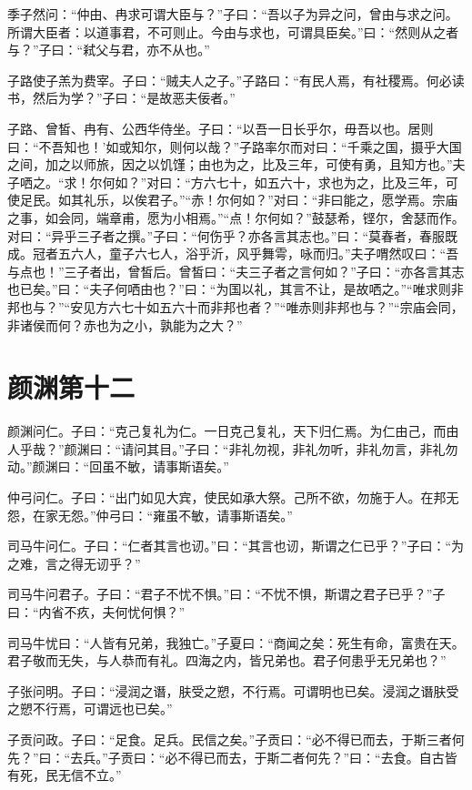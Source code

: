 \documentclass[twoside,openany]{book}
\begin{document}
季子然问：“仲由、冉求可谓大臣与？”子曰：“吾以子为异之问，曾由与求之问。所谓大臣者：以道事君，不可则止。今由与求也，可谓具臣矣。”曰：“然则从之者与？”子曰：“弒父与君，亦不从也。” 

子路使子羔为费宰。子曰：“贼夫人之子。”子路曰：“有民人焉，有社稷焉。何必读书，然后为学？”子曰：“是故恶夫佞者。” 

子路、曾皙、冉有、公西华侍坐。子曰：“以吾一日长乎尔，毋吾以也。居则曰：“不吾知也！’如或知尔，则何以哉？”子路率尔而对曰：“千乘之国，摄乎大国之间，加之以师旅，因之以饥馑；由也为之，比及三年，可使有勇，且知方也。”夫子哂之。“求！尔何如？”对曰：“方六七十，如五六十，求也为之，比及三年，可使足民。如其礼乐，以俟君子。”“赤！尔何如？”对曰：“非曰能之，愿学焉。宗庙之事，如会同，端章甫，愿为小相焉。”“点！尔何如？”鼓瑟希，铿尔，舍瑟而作。对曰：“异乎三子者之撰。”子曰：“何伤乎？亦各言其志也。”曰：“莫春者，春服既成。冠者五六人，童子六七人，浴乎沂，风乎舞雩，咏而归。”夫子喟然叹曰：“吾与点也！”三子者出，曾皙后。曾皙曰：“夫三子者之言何如？”子曰：“亦各言其志也已矣。”曰：“夫子何哂由也？”曰：“为国以礼，其言不让，是故哂之。”“唯求则非邦也与？”“安见方六七十如五六十而非邦也者？”“唯赤则非邦也与？”“宗庙会同，非诸侯而何？赤也为之小，孰能为之大？” 


\chapter{颜渊第十二}\label{ch12}

颜渊问仁。子曰：“克己复礼为仁。一日克己复礼，天下归仁焉。为仁由己，而由人乎哉？”颜渊曰：“请问其目。”子曰：“非礼勿视，非礼勿听，非礼勿言，非礼勿动。”颜渊曰：“回虽不敏，请事斯语矣。”

仲弓问仁。子曰：“出门如见大宾，使民如承大祭。己所不欲，勿施于人。在邦无怨，在家无怨。”仲弓曰：“雍虽不敏，请事斯语矣。”

司马牛问仁。子曰：“仁者其言也讱。”曰：“其言也讱，斯谓之仁已乎？”子曰：“为之难，言之得无讱乎？”

司马牛问君子。子曰：“君子不忧不惧。”曰：“不忧不惧，斯谓之君子已乎？”子曰：“内省不疚，夫何忧何惧？”

司马牛忧曰：“人皆有兄弟，我独亡。”子夏曰：“商闻之矣：死生有命，富贵在天。君子敬而无失，与人恭而有礼。四海之内，皆兄弟也。君子何患乎无兄弟也？”

子张问明。子曰：“浸润之谮，肤受之愬，不行焉。可谓明也已矣。浸润之谮肤受之愬不行焉，可谓远也已矣。”

子贡问政。子曰：“足食。足兵。民信之矣。”子贡曰：“必不得已而去，于斯三者何先？”曰：“去兵。”子贡曰：“必不得已而去，于斯二者何先？”曰：“去食。自古皆有死，民无信不立。”
\end{document}
